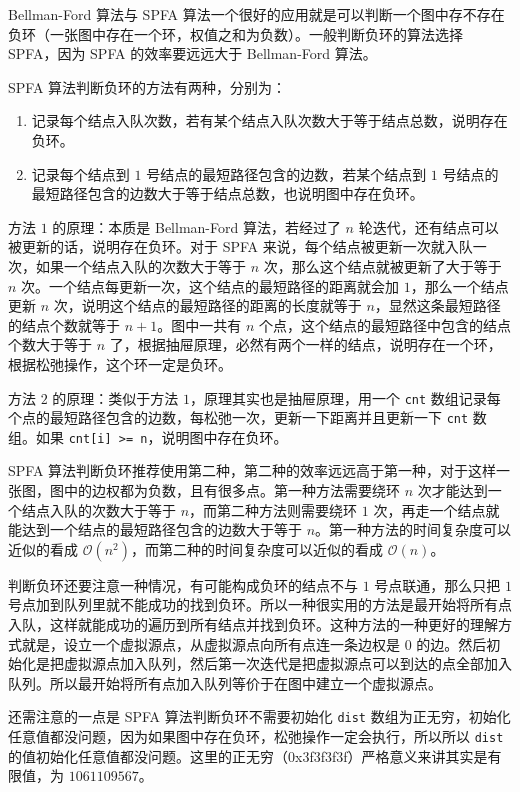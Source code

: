 Bellman-Ford 算法与 SPFA 算法一个很好的应用就是可以判断一个图中存不存在负环（一张图中存在一个环，权值之和为负数）。一般判断负环的算法选择 SPFA，因为 SPFA 的效率要远远大于 Bellman-Ford 算法。

SPFA 算法判断负环的方法有两种，分别为：

\begin{enumerate}
\item 记录每个结点入队次数，若有某个结点入队次数大于等于结点总数，说明存在负环。
\item 记录每个结点到 $1$ 号结点的最短路径包含的边数，若某个结点到 $1$ 号结点的最短路径包含的边数大于等于结点总数，也说明图中存在负环。
\end{enumerate}

方法 $1$ 的原理：本质是 Bellman-Ford 算法，若经过了 $n$ 轮迭代，还有结点可以被更新的话，说明存在负环。对于 SPFA 来说，每个结点被更新一次就入队一次，如果一个结点入队的次数大于等于 $n$ 次，那么这个结点就被更新了大于等于 $n$ 次。一个结点每更新一次，这个结点的最短路径的距离就会加 $1$，那么一个结点更新 $n$ 次，说明这个结点的最短路径的距离的长度就等于 $n$，显然这条最短路径的结点个数就等于 $n + 1$。图中一共有 $n$ 个点，这个结点的最短路径中包含的结点个数大于等于 $n$ 了，根据抽屉原理，必然有两个一样的结点，说明存在一个环，根据松弛操作，这个环一定是负环。

方法 $2$ 的原理：类似于方法 $1$，原理其实也是抽屉原理，用一个 \verb|cnt| 数组记录每个点的最短路径包含的边数，每松弛一次，更新一下距离并且更新一下 \verb|cnt| 数组。如果 \verb|cnt[i] >= n|，说明图中存在负环。

SPFA 算法判断负环推荐使用第二种，第二种的效率远远高于第一种，对于这样一张图，图中的边权都为负数，且有很多点。第一种方法需要绕环 $n$ 次才能达到一个结点入队的次数大于等于 $n$，而第二种方法则需要绕环 $1$ 次，再走一个结点就能达到一个结点的最短路径包含的边数大于等于 $n$。第一种方法的时间复杂度可以近似的看成 $\mathcal{O}(n^2)$，而第二种的时间复杂度可以近似的看成 $\mathcal{O}(n)$。

判断负环还要注意一种情况，有可能构成负环的结点不与 $1$ 号点联通，那么只把 $1$ 号点加到队列里就不能成功的找到负环。所以一种很实用的方法是最开始将所有点入队，这样就能成功的遍历到所有结点并找到负环。这种方法的一种更好的理解方式就是，设立一个虚拟源点，从虚拟源点向所有点连一条边权是 $0$ 的边。然后初始化是把虚拟源点加入队列，然后第一次迭代是把虚拟源点可以到达的点全部加入队列。所以最开始将所有点加入队列等价于在图中建立一个虚拟源点。

还需注意的一点是 SPFA 算法判断负环不需要初始化 \verb|dist| 数组为正无穷，初始化任意值都没问题，因为如果图中存在负环，松弛操作一定会执行，所以所以 \verb|dist| 的值初始化任意值都没问题。这里的正无穷（0x3f3f3f3f）严格意义来讲其实是有限值，为 $1061109567$。

